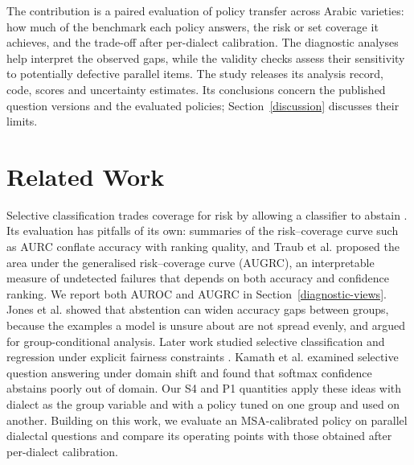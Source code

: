 \documentclass[applsci,article,submit,pdftex,oneauthor]{Definitions/mdpi}
\begin{document}
The contribution is a paired evaluation of policy transfer across Arabic varieties: how much of the benchmark each policy answers, the risk or set coverage it achieves, and the trade-off after per-dialect calibration. The diagnostic analyses help interpret the observed gaps, while the validity checks assess their sensitivity to potentially defective parallel items. The study releases its analysis record, code, scores and uncertainty estimates. Its conclusions concern the published question versions and the evaluated policies; Section~\ref{discussion} discusses their limits.

\hypertarget{related-work}{%
\section{Related Work}\label{related-work}}

Selective classification trades coverage for risk by allowing a classifier to abstain \cite{elyaniv2010foundations, geifman2017selective}. Its evaluation has pitfalls of its own: summaries of the risk--coverage curve such as AURC conflate accuracy with ranking quality, and Traub et al. \cite{traub2024overcoming} proposed the area under the generalised risk--coverage curve (AUGRC), an interpretable measure of undetected failures that depends on both accuracy and confidence ranking. We report both AUROC and AUGRC in Section~\ref{diagnostic-views}. Jones et al. \cite{jones2021selective} showed that abstention can widen accuracy gaps between groups, because the examples a model is unsure about are not spread evenly, and argued for group-conditional analysis. Later work studied selective classification and regression under explicit fairness constraints \cite{lee2021fair, shah2022selective}. Kamath et al. \cite{kamath2020selective} examined selective question answering under domain shift and found that softmax confidence abstains poorly out of domain. Our S4 and P1 quantities apply these ideas with dialect as the group variable and with a policy tuned on one group and used on another. Building on this work, we evaluate an MSA-calibrated policy on parallel dialectal questions and compare its operating points with those obtained after per-dialect calibration.
\end{document}
